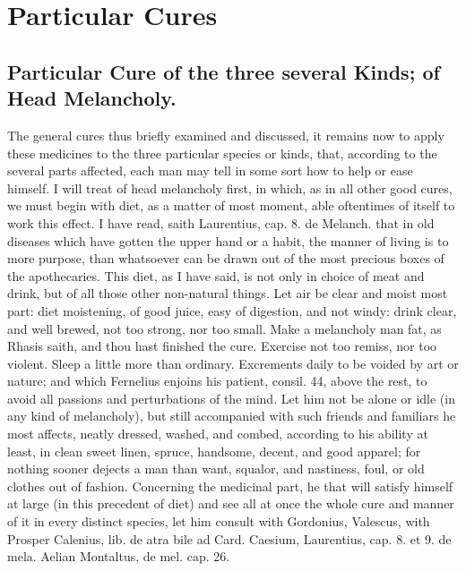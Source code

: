 \chapter{Particular Cures}

\section[Cure of three kinds]{Particular Cure of the three several Kinds; of Head Melancholy.}

The general cures thus briefly examined and discussed, it remains now
to apply these medicines to the three particular species or kinds,
that, according to the several parts affected, each man may tell in
some sort how to help or ease himself. I will treat of head melancholy
first, in which, as in all other good cures, we must begin with diet,
as a matter of most moment, able oftentimes of itself to work this
effect. I have read, saith Laurentius, cap. 8. de Melanch. that in old
diseases which have gotten the upper hand or a habit, the manner of
living is to more purpose, than whatsoever can be drawn out of the most
precious boxes of the apothecaries. This diet, as I have said, is not
only in choice of meat and drink, but of all those other non-natural
things. Let air be clear and moist most part: diet moistening, of good
juice, easy of digestion, and not windy: drink clear, and well brewed,
not too strong, nor too small. Make a melancholy man fat, as
Rhasis saith, and thou hast finished the cure. Exercise not too
remiss, nor too violent. Sleep a little more than ordinary.
Excrements daily to be voided by art or nature; and which
Fernelius enjoins his patient, consil. 44, above the rest, to avoid all
passions and perturbations of the mind. Let him not be alone or idle
(in any kind of melancholy), but still accompanied with such friends
and familiars he most affects, neatly dressed, washed, and combed,
according to his ability at least, in clean sweet linen, spruce,
handsome, decent, and good apparel; for nothing sooner dejects a man
than want, squalor, and nastiness, foul, or old clothes out of fashion.
Concerning the medicinal part, he that will satisfy himself at large
(in this precedent of diet) and see all at once the whole cure and
manner of it in every distinct species, let him consult with Gordonius,
Valescus, with Prosper Calenius, lib. de atra bile ad Card. Caesium,
Laurentius, cap. 8. et 9. de mela. Aelian Montaltus, de mel. cap. 26.
